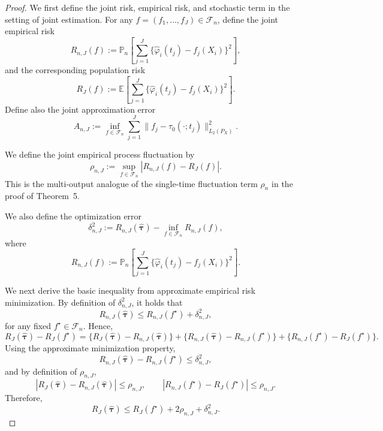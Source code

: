 \documentclass{article}
\newenvironment{proofof}[1]
{\renewcommand{\proofname}{Proof of #1}\begin{proof}}
{\end{proof}}
\begin{document}
 

\begin{proofof}{Theorem \ref{thm:joint_pseudo}:}
   We first define the joint risk, empirical risk, and stochastic term in the setting of joint estimation. For any \(f=(f_1,\ldots,f_J)\in\mathcal F_n\), define the joint empirical risk
\[
R_{n,J}(f)
:=
\mathbb P_n\!\left[
\sum_{j=1}^J \{\hat\varphi_i(t_j)-f_j(X_i)\}^2
\right],
\]
and the corresponding population risk
\[
R_J(f)
:=
\mathbb E\!\left[
\sum_{j=1}^J \{\hat\varphi_i(t_j)-f_j(X_i)\}^2
\right].
\]
Define also the joint approximation error
\[
A_{n,J}
:=
\inf_{f\in\mathcal F_n}
\sum_{j=1}^J \|f_j-\tau_0(\cdot;t_j)\|_{L_2(P_X)}^2.
\]

We define the joint empirical process fluctuation by
\[
\rho_{n,J}
:=
\sup_{f\in\mathcal F_n}
\left|
R_{n,J}(f)-R_J(f)
\right|.
\]
This is the multi-output analogue of the single-time fluctuation term \(\rho_n\) in the proof of Theorem~5.

We also define the optimization error
\[
\delta_{n,J}^2
:=
R_{n,J}(\hat{\boldsymbol\tau})
-
\inf_{f\in\mathcal F_n} R_{n,J}(f),
\]
where
\[
R_{n,J}(f)
:=
\mathbb P_n\!\left[
\sum_{j=1}^J \{\hat\varphi_i(t_j)-f_j(X_i)\}^2
\right].
\]

We next derive the basic inequality from approximate empirical risk minimization. By definition of $\delta_{n,J}^2$, it holds that 
\[
R_{n,J}(\hat{\boldsymbol\tau})
\le
R_{n,J}(f^\star)+\delta_{n,J}^2, 
\]
for any fixed \(f^\star\in\mathcal F_n\). Hence,
\[
R_J(\hat{\boldsymbol\tau})-R_J(f^\star)
=
\{R_J(\hat{\boldsymbol\tau})-R_{n,J}(\hat{\boldsymbol\tau})\}
+\{R_{n,J}(\hat{\boldsymbol\tau})-R_{n,J}(f^\star)\}
+\{R_{n,J}(f^\star)-R_J(f^\star)\}.
\]
Using the approximate minimization property,
\[
R_{n,J}(\hat{\boldsymbol\tau})-R_{n,J}(f^\star)\le \delta_{n,J}^2,
\]
and by definition of \(\rho_{n,J}\),
\[
|R_J(\hat{\boldsymbol\tau})-R_{n,J}(\hat{\boldsymbol\tau})|
\le \rho_{n,J},
\qquad
|R_{n,J}(f^\star)-R_J(f^\star)|
\le \rho_{n,J}.
\]
Therefore,
\[
R_J(\hat{\boldsymbol\tau})
\le
R_J(f^\star)+2\rho_{n,J}+\delta_{n,J}^2.
\]


\end{proofof}
\end{document}
